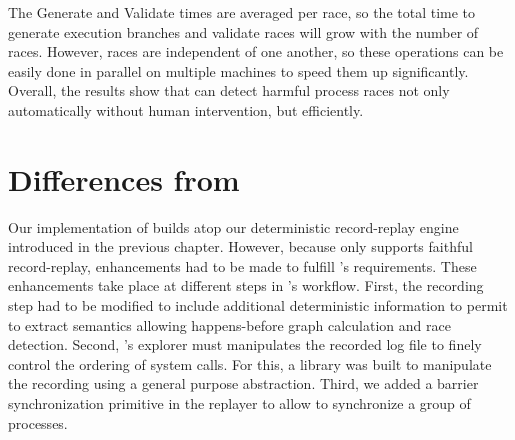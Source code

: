 The Generate and Validate times are averaged per race, so the total
time to generate execution branches and validate races will grow with
the number of races.  However, races are independent of one another,
so these operations can be easily done in parallel on multiple
machines to speed them up significantly.  Overall, the results show
that \racepro can detect harmful process races not only automatically
without human intervention, but efficiently.

\section{Differences from \scribe} \label{racepro:sec:scribe}

Our implementation of \racepro builds atop our deterministic \scribe
record-replay engine introduced in the previous chapter.  However, because
\scribe only supports faithful record-replay, enhancements had to be made to
fulfill \racepro's requirements. These enhancements take place at
different steps in \racepro's workflow. First, the recording step had to be
modified to include additional deterministic information to permit \racepro
to extract semantics allowing happens-before graph calculation and race detection.
Second, \racepro's explorer must manipulates the recorded log file to finely control
the ordering of system calls. For this, a library was built to manipulate the
recording using a general purpose abstraction. Third, we added a barrier
synchronization primitive in the replayer to allow \racepro to synchronize
a group of processes.

